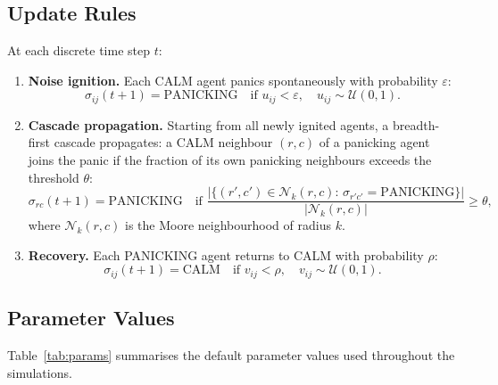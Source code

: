 \documentclass[12pt, a4paper]{article}
\begin{document}
\subsection{Update Rules}

At each discrete time step $t$:
\begin{enumerate}
  \item \textbf{Noise ignition.}  Each CALM agent panics spontaneously with
        probability $\varepsilon$:
        \begin{equation}
          \sigma_{ij}(t+1) = \text{PANICKING}
          \quad \text{if } u_{ij} < \varepsilon,
          \quad u_{ij} \sim \mathcal{U}(0,1).
          \label{eq:noise}
        \end{equation}

  \item \textbf{Cascade propagation.}  Starting from all newly ignited agents, a
        breadth-first cascade propagates: a CALM neighbour $(r,c)$ of a panicking
        agent joins the panic if the fraction of its own panicking neighbours
        exceeds the threshold $\theta$:
        \begin{equation}
          \sigma_{rc}(t+1) = \text{PANICKING}
          \quad \text{if }
          \frac{|\{(r',c') \in \mathcal{N}_k(r,c):\, \sigma_{r'c'} = \text{PANICKING}\}|}{|\mathcal{N}_k(r,c)|}
          \geq \theta,
          \label{eq:cascade}
        \end{equation}
        where $\mathcal{N}_k(r,c)$ is the Moore neighbourhood of radius $k$.

  \item \textbf{Recovery.}  Each PANICKING agent returns to CALM with probability
        $\rho$:
        \begin{equation}
          \sigma_{ij}(t+1) = \text{CALM}
          \quad \text{if } v_{ij} < \rho,
          \quad v_{ij} \sim \mathcal{U}(0,1).
          \label{eq:recovery}
        \end{equation}
\end{enumerate}

\subsection{Parameter Values}

Table~\ref{tab:params} summarises the default parameter values used throughout
the simulations.
\end{document}
